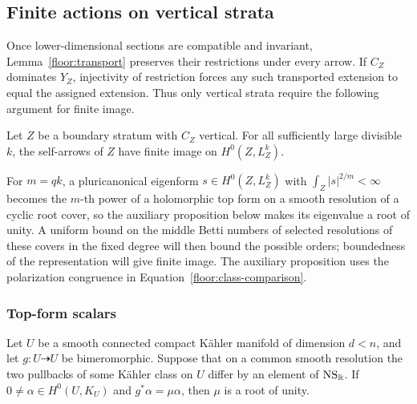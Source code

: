 \subsection{Finite actions on vertical strata}

Once lower-dimensional sections are compatible and invariant,
Lemma~\ref{floor:transport} preserves their restrictions under every arrow.
If \(C_Z\) dominates \(Y_Z\), injectivity of restriction forces any such
transported extension to equal the assigned extension.  Thus only vertical
strata require the following argument for finite image.

\begin{proposition}\label{floor:finite-action}
Let \(Z\) be a boundary stratum with \(C_Z\) vertical.  For all sufficiently
large divisible \(k\), the self-arrows of \(Z\) have finite image on
\(H^0(Z,L_Z^k)\).
\end{proposition}

For \(m=qk\), a pluricanonical eigenform \(s\in H^0(Z,L_Z^k)\) with
\(\int_Z|s|^{2/m}<\infty\) becomes the \(m\)-th power of a holomorphic top
form on a smooth resolution of a cyclic root cover, so the auxiliary proposition below makes its
eigenvalue a root of unity.  A uniform bound on the middle Betti numbers of
selected resolutions of these covers in the fixed degree will then bound
the possible orders; boundedness of the representation will give finite
image. The auxiliary proposition uses the polarization congruence in
Equation~\eqref{floor:class-comparison}.

\subsubsection{Top-form scalars}

\begin{proposition}\label{floor:top-form-scalar}
Let \(U\) be a smooth connected compact K\"ahler manifold of dimension
\(d<n\), and let \(g:U\dashrightarrow U\) be bimeromorphic.  Suppose
that on a common smooth resolution the two pullbacks of some K\"ahler
class on \(U\) differ by an element of \(\operatorname{NS}_\mathbb R\).  If
\(0\ne\alpha\in H^0(U,K_U)\) and \(g^*\alpha=\mu\alpha\), then
\(\mu\) is a root of unity.
\end{proposition}

